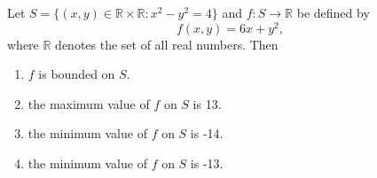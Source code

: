 \item 
Let $S = \{(x, y) \in \mathbb{R} \times \mathbb{R} : x^2 - y^2 = 4\}$ and $f: S \rightarrow \mathbb{R}$ be defined by
\[
f(x, y) = 6x + y^2,
\]
where $\mathbb{R}$ denotes the set of all real numbers. Then
\begin{enumerate}
    \item $f$ is bounded on $S$.
    \item the maximum value of $f$ on $S$ is 13.
    \item the minimum value of $f$ on $S$ is -14.
    \item the minimum value of $f$ on $S$ is -13.
\end{enumerate}



